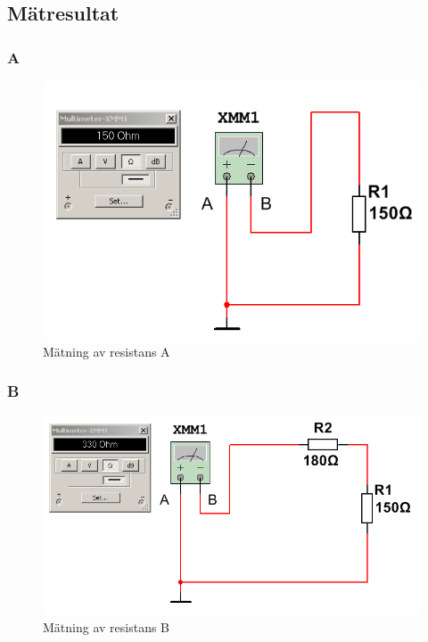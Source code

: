 \documentclass[11pt,a4paper]{article}
\begin{document}
\subsection{Mätresultat}\label{}

\subsubsection{A}
\begin{figure}[H]
    \centering
    \includegraphics[scale=0.5]{ee466multisim/4a.png}
    \caption{Mätning av resistans A}
    \label{fig:sim-4a}
\end{figure}

\subsubsection{B}
\begin{figure}[H]
    \centering
    \includegraphics[scale=0.5]{ee466multisim/4b.png}
    \caption{Mätning av resistans B}
    \label{fig:sim-4b}
\end{figure}
\end{document}
